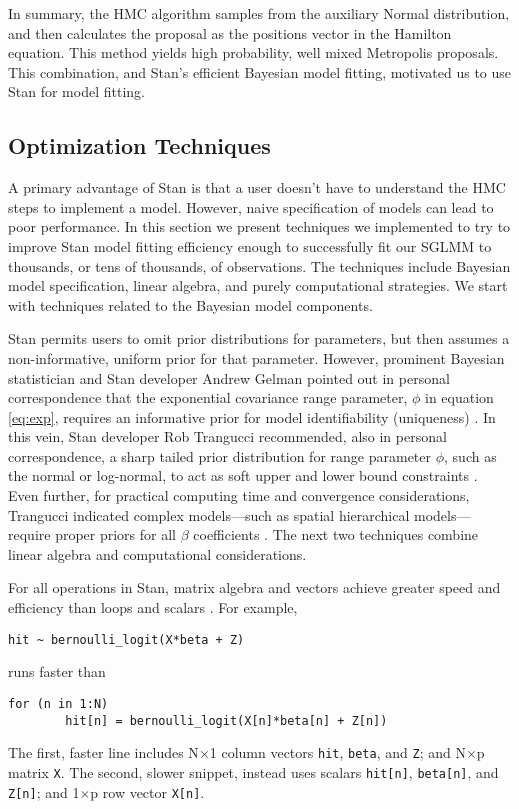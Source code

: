 In summary, the HMC algorithm samples from the auxiliary Normal distribution, and then calculates the proposal as the positions vector in the Hamilton equation. This method yields high probability, well mixed Metropolis proposals. This combination, and Stan's efficient Bayesian model fitting, motivated us to use Stan for model fitting.

\subsection{Optimization Techniques} %
A primary advantage of Stan is that a user doesn't have to understand the HMC steps to implement a model. However, naive specification of models can lead to poor performance. In this section we present techniques we implemented to try to improve Stan model fitting efficiency enough to successfully fit our SGLMM to thousands, or tens of thousands, of observations. The techniques include Bayesian model specification, linear algebra, and purely computational strategies. We start with techniques related to the Bayesian model components.

Stan permits users to omit prior distributions for parameters, but then assumes a non-informative, uniform prior for that parameter. However, prominent Bayesian statistician and Stan developer Andrew Gelman pointed out in personal correspondence that the exponential covariance range parameter, $\phi$ in equation \ref{eq:exp}, requires an informative prior for model identifiability (uniqueness) \citep{Gelman2014}. In this vein, Stan developer Rob Trangucci recommended, also in personal correspondence, a sharp tailed prior distribution for range parameter $\phi$, such as the normal or log-normal, to act as soft upper and lower bound constraints \citep{Trangucci}. Even further, for practical computing time and convergence considerations, Trangucci indicated complex models---such as spatial hierarchical models---require proper priors for all $\beta$ coefficients \citep{Trangucci}. The next two techniques combine linear algebra and computational considerations.

For all operations in Stan, matrix algebra and vectors achieve greater speed and efficiency than loops and scalars \citep{STANtheMan}. For example, 
\begin{verbatim}
hit ~ bernoulli_logit(X*beta + Z)
\end{verbatim}
runs faster than
\begin{verbatim}
for (n in 1:N)
        hit[n] = bernoulli_logit(X[n]*beta[n] + Z[n])
\end{verbatim}
The first, faster line includes N$\times$1 column vectors \verb|hit|, \verb|beta|, and \verb|Z|; and N$\times$p matrix \verb|X|. The second, slower snippet, instead uses scalars \verb|hit[n]|, \verb|beta[n]|, and \verb|Z[n]|; and 1$\times$p row vector \verb|X[n]|.

